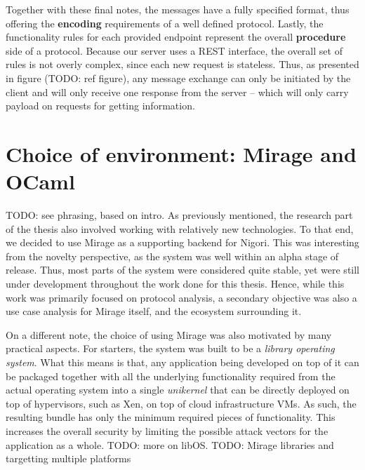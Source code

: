 Together with these final notes, the messages have a fully specified format, thus offering the \textbf{encoding} requirements of a well defined protocol.
Lastly, the functionality rules for each provided endpoint represent the overall \textbf{procedure} side of a protocol.
Because our server uses a REST interface, the overall set of rules is not overly complex, since each new request is stateless.
Thus, as presented in figure (TODO: ref figure), any message exchange can only be initiated by the client and will only receive one response from the server -- which will only carry payload on requests for getting information.

\section{Choice of environment: Mirage and OCaml}
TODO: see phrasing, based on intro.
As previously mentioned, the research part of the thesis also involved working with relatively new technologies.
To that end, we decided to use Mirage as a supporting backend for Nigori.
This was interesting from the novelty perspective, as the system was well within an alpha stage of release.
Thus, most parts of the system were considered quite stable, yet were still under development throughout the work done for this thesis.
Hence, while this work was primarily focused on protocol analysis, a secondary objective was also a use case analysis for Mirage itself, and the ecosystem surrounding it.

On a different note, the choice of using Mirage was also motivated by many practical aspects.
For starters, the system was built to be a \textit{library operating system}.
What this means is that, any application being developed on top of it can be packaged together with all the underlying functionality required from the actual operating system into a single \textit{unikernel} that can be directly deployed on top of hypervisors, such as Xen, on top of cloud infrastructure VMs.
As such, the resulting bundle has only the minimum required pieces of functionality.
This increases the overall security by limiting the possible attack vectors for the application as a whole.
TODO: more on libOS.
TODO: Mirage libraries and targetting multiple platforms

